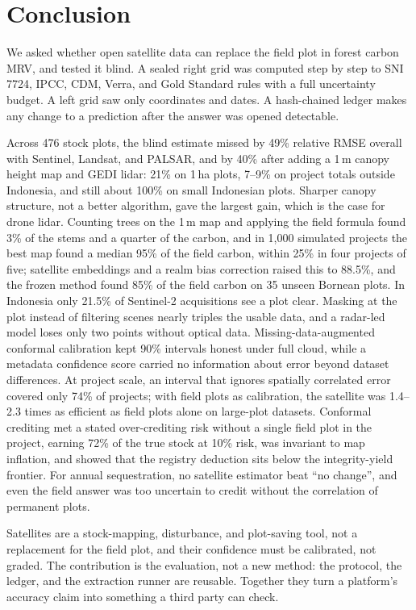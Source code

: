 \documentclass[conference,a4paper]{IEEEtran}
\begin{document}
\section{Conclusion}
We asked whether open satellite data can replace the field plot in forest carbon MRV, and tested it blind. A sealed right grid was computed step by step to SNI 7724, IPCC, CDM, Verra, and Gold Standard rules with a full uncertainty budget. A left grid saw only coordinates and dates. A hash-chained ledger makes any change to a prediction after the answer was opened detectable.

Across 476 stock plots, the blind estimate missed by 49\% relative RMSE overall with Sentinel, Landsat, and PALSAR, and by 40\% after adding a 1\,m canopy height map and GEDI lidar: 21\% on 1\,ha plots, 7--9\% on project totals outside Indonesia, and still about 100\% on small Indonesian plots. Sharper canopy structure, not a better algorithm, gave the largest gain, which is the case for drone lidar. Counting trees on the 1\,m map and applying the field formula found 3\% of the stems and a quarter of the carbon, and in 1{,}000 simulated projects the best map found a median 95\% of the field carbon, within 25\% in four projects of five; satellite embeddings and a realm bias correction raised this to 88.5\%, and the frozen method found 85\% of the field carbon on 35 unseen Bornean plots. In Indonesia only 21.5\% of Sentinel-2 acquisitions see a plot clear. Masking at the plot instead of filtering scenes nearly triples the usable data, and a radar-led model loses only two points without optical data. Missing-data-augmented conformal calibration kept 90\% intervals honest under full cloud, while a metadata confidence score carried no information about error beyond dataset differences. At project scale, an interval that ignores spatially correlated error covered only 74\% of projects; with field plots as calibration, the satellite was 1.4--2.3 times as efficient as field plots alone on large-plot datasets. Conformal crediting met a stated over-crediting risk without a single field plot in the project, earning 72\% of the true stock at 10\% risk, was invariant to map inflation, and showed that the registry deduction sits below the integrity-yield frontier. For annual sequestration, no satellite estimator beat ``no change'', and even the field answer was too uncertain to credit without the correlation of permanent plots.

Satellites are a stock-mapping, disturbance, and plot-saving tool, not a replacement for the field plot, and their confidence must be calibrated, not graded. The contribution is the evaluation, not a new method: the protocol, the ledger, and the extraction runner are reusable. Together they turn a platform's accuracy claim into something a third party can check.
\end{document}
